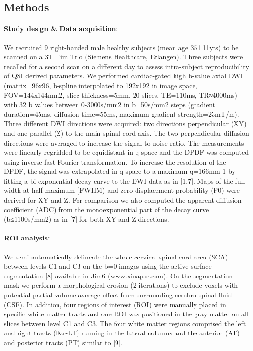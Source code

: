\subsection*{Methods} 
\paragraph{Study design \& Data acquisition:} We recruited 9 right-handed male healthy subjects (mean age 35±11yrs) to be scanned on a 3T Tim Trio (Siemens Healthcare, Erlangen). Three subjects were recalled for a second scan on a different day to assess intra-subject reproducibility of QSI derived parameters. We performed cardiac-gated high b-value axial DWI (matrix=96x96, b-spline interpolated to 192x192 in image space, FOV=144x144mm2, slice thickness=5mm, 20 slices, TE=110ms, TR≈4000ms) with 32 b values between 0-3000s/mm2 in b=50s/mm2 steps (gradient duration=45ms, diffusion time=55ms, maximum gradient strength=23mT/m). Three different DWI directions were acquired: two directions perpendicular (XY) and one parallel (Z) to the main spinal cord axis. The two perpendicular diffusion directions were averaged to increase the signal-to-noise ratio. The measurements were linearly regridded to be equidistant in q-space and the DPDF was computed using inverse fast Fourier transformation. To increase the resolution of the DPDF, the signal was extrapolated in q-space to a maximum q=166mm-1 by fitting a bi-exponential decay curve to the DWI data as in [1,7]. Maps of the full width at half maximum (FWHM) and zero displacement probability (P0) were derived for XY and Z. For comparison we also computed the apparent diffusion coefficient (ADC) from the monoexponential part of the decay curve (b≤1100s/mm2) as in [7] for both XY and Z directions. 
\paragraph{ROI analysis:} We semi-automatically delineate the whole cervical spinal cord area (SCA) between levels C1 and C3 on the b=0 images using the active surface segmentation [8] available in Jim6 (www.xinapse.com). On the segmentation mask we perform a morphological erosion (2 iterations) to exclude voxels with potential partial-volume average effect from surrounding cerebro-spinal fluid (CSF). In addition, four regions of interest (ROI) were manually placed in specific white matter tracts and one ROI was positioned in the gray matter on all slices between level C1 and C3. The four white matter regions comprised the left and right tracts (l\&r-LT) running in the lateral columns and the anterior (AT) and posterior tracts (PT) similar to [9]. 
